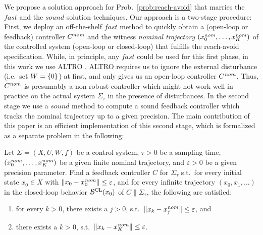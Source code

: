 We propose a solution approach for Prob.~\ref{prob:reach-avoid} that marries the $\mathit{fast}$ and the $\mathit{sound}$ solution techniques.
Our approach is a two-stage procedure: 
First, we deploy an off-the-shelf $\mathit{fast}$ method to quickly obtain a (open-loop or feedback) controller $C^{\mathit{nom}}$ and the witness \emph{nominal trajectory} $(x_0^{\mathit{nom}},\ldots,x_K^{\mathit{nom}})$ of the controlled system (open-loop or closed-loop) that fulfills the reach-avoid specification.
While, in principle, any $\mathit{fast}$ could be used for this first phase, in this work we use ALTRO \cite{altro}.
ALTRO requires us to ignore the external disturbance (i.e.\ set $W=\{ 0 \}$) at first, and only gives us an open-loop controller $C^{\mathit{nom}}$.
Thus, $C^{\mathit{nom}}$ is presumably a non-robust controller which might not work well in practice on the actual system $\Sigma_\tau$ in the presence of disturbances.
In the second stage we use a $\mathit{sound}$ method to compute a sound feedback controller which tracks the nominal trajectory up to a given precision.
The main contribution of this paper is an efficient implementation of this second stage, which is formalized as a separate problem in the following:

\begin{problem}\label{prob:tracking}
	Let $\Sigma=(X,U,W,f)$ be a control system, $\tau>0$ be a sampling time, $(x_0^{\mathit{nom}},\ldots,x_K^{\mathit{nom}})$ be a given finite nominal trajectory, and $\varepsilon>0$ be a given precision parameter.
	Find a feedback controller $C$ for $\Sigma_\tau$ s.t.\ for every initial state $x_0\in X$ with $\| x_0-x_0^{\mathit{nom}} \|\leq \varepsilon$, and for every infinite trajectory $(x_0,x_1,\ldots)$ in the closed-loop behavior $\mathcal{B}^{\mathrm{CL}}(x_0)$ of $C \parallel \Sigma_\tau$, the following are satisfied:
	\begin{enumerate}
		\item for every $k > 0$, there exists a $j>0$, s.t.\ $\| x_k-x_j^{\mathit{nom}} \| \leq \varepsilon$, and
		\item there exists a $k>0$, s.t.\ $\| x_k-x_K^{\mathit{nom}} \|\leq \varepsilon$.
	\end{enumerate} 
\end{problem}


